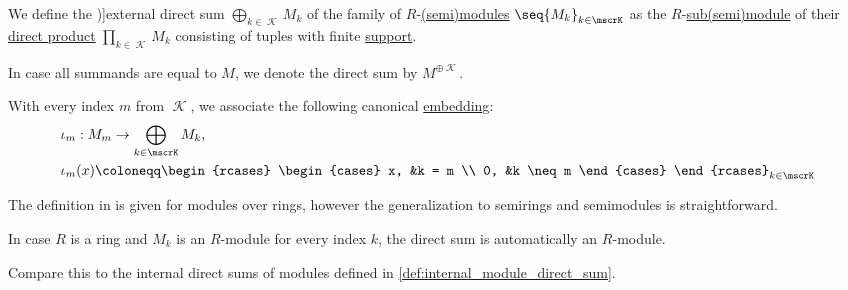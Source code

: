 \begin{definition}\label{def:external_semimodule_direct_sum}
  We define the \term[ru=внешнее прямое произведение (\cite[351]{Винберг2014КурсАлгебры})]{external direct sum} \( \bigoplus_{k \in \mscrK} M_k \) of the family of \( R \)-\hyperref[def:semimodule]{(semi)modules} \( \seq{ M_k }_{k \in \mscrK} \) as the \( R \)-\hyperref[def:semimodule/subobject]{sub(semi)module} of their \hyperref[def:fol_direct_product]{direct product} \( \prod_{k \in \mscrK} M_k \) consisting of tuples with finite \hyperref[def:function_support]{support}.

  In case all summands are equal to \( M \), we denote the direct sum by \( M^{\oplus \mscrK} \).

  \begin{thmenum}
    \mimprovised With every index \( m \) from \( \mscrK \), we associate the following canonical \hyperref[def:semimodule/morphism]{embedding}:
    \begin{equation*}
      \begin{aligned}
        &\iota_m: M_m \to \bigoplus_{k \in \mscrK} M_k, \\
        &\iota_m(x) \coloneqq \begin{rcases}
          \begin{cases}
            x, &k = m \\
            0, &k \neq m
          \end{cases}
        \end{rcases}_{k \in \mscrK}
      \end{aligned}
    \end{equation*}
  \end{thmenum}
\end{definition}
\begin{comments}
  \item The definition in \cite[202]{Bourbaki1998Algebra1to3} is given for modules over rings, however the generalization to semirings and semimodules is straightforward.

  In case \( R \) is a ring and \( M_k \) is an \( R \)-module for every index \( k \), the direct sum is automatically an \( R \)-module.

  \item Compare this to the internal direct sums of modules defined in \cref{def:internal_module_direct_sum}.
\end{comments}

